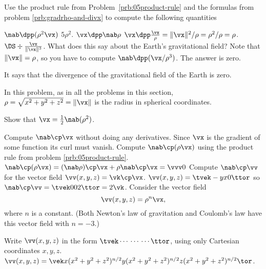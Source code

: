 \begin{multicols}{2}
\problem Use the product rule from Problem~\ref{prb:05product-rule} and 
the formulas from problem \ref{prb:gradrho-and-divx} to compute the
following quantities

\subprob $\nab\dpp(\rho^2\vx)$ 
\answer
$5\rho^2$.
\endanswer
\subprob $\vx\dpp\nab\rho$ 
\answer
$\vx\dpp\frac\vx\rho= \|\vx\|^2/\rho = \rho^2/\rho = \rho$.
\endanswer
\subprob $\DS \div \frac{\vx} {\|\vx\|^3}$.   What does this say 
about the Earth's gravitational field?
\answer
Note that $\|\vx\| = \rho$, so you have to compute $\nab\dpp(\vx/\rho^3)$.
The answer is zero.

It says that the divergence of the gravitational field of the Earth is zero.

\endanswer



\problem \label{prb:x-no-curl} 
In this problem, as in all the problems in this section,
$\rho = \sqrt{x^2+y^2+z^2} = \|\vx\|$
is the radius in spherical coordinates.

\subprob Show that $\vx = \frac12 \nab(\rho^2)$.  

\subprob Compute $\nab\cp\vx$ without doing any derivatives.  
\answer
Since $\vx$ is the gradient of some function its curl must vanish.
\endanswer
\subprob Compute $\nab\cp(\rho\vx)$ using the product rule from 
problem \ref{prb:05product-rule}.
\answer
$\nab\cp(\rho\vx) = (\nab \rho)\cp \vx + \rho \nab\cp\vx = \vvv0$
\endanswer
\problem Compute $\nab\cp\vv$ for the vector field 
$\vv(x, y, z) = \vk\cp\vx$.
\answer
$\vv(x, y, z) = \tvek -y \\x \\ 0\ttor$
so $\nab\cp\vv = \tvek 0\\0\\2\ttor = 2\vk$.
\endanswer
\problem\label{prb:05div-rho-n-x} Consider the vector field
\[
\vv(x, y, z) = \rho^n \vx,
\]
where $n$ is a constant.   (Both Newton's law of gravitation
and Coulomb's law have this vector field with $n=-3$.)

\subprob Write $\vv(x, y, z)$ in the form $\tvek \cdots\\\cdots\\\cdots\ttor$, 
using only Cartesian coordinates $x, y, z$.
\answer
$\vv(x, y, z) =
\vek
   x(x^2+y^2+z^2)^{n/2} \\ y(x^2+y^2+z^2)^{n/2} \\ z(x^2+y^2+z^2)^{n/2}
\tor$.
\endanswer



\end{multicols}
